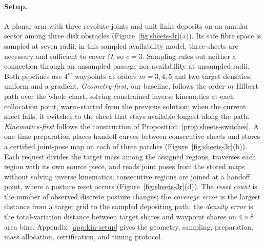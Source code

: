\paragraph{Setup.}
A planar arm with three revolute joints and unit links deposits on an annular sector among three disk obstacles (Figure~\ref{fig:sheets-3r}(a)). Its safe fibre space is sampled at seven radii; in this sampled availability model, three sheets are necessary and sufficient to cover $\Omega$, so $c=3$. Sampling rules out neither a connection through an unsampled passage nor availability at unsampled radii. Both pipelines use $4^m$ waypoints at orders $m=3,4,5$ and two target densities, uniform and a gradient. \emph{Geometry-first}, our baseline, follows the order-$m$ Hilbert path over the whole chart, solving constrained inverse kinematics at each collocation point, warm-started from the previous solution; when the current sheet fails, it switches to the sheet that stays available longest along the path. \emph{Kinematics-first} follows the construction of Proposition~\ref{prop:sheets-switches}. A one-time preparation places handoff curves between consecutive sheets and stores a certified joint-pose map on each of three patches (Figure~\ref{fig:sheets-3r}(b)). Each request divides the target mass among the assigned regions, traverses each region with its own source piece, and reads joint poses from the stored maps without solving inverse kinematics; consecutive regions are joined at a handoff point, where a posture reset occurs (Figure~\ref{fig:sheets-3r}(d)). The \emph{reset count} is the number of observed discrete posture changes; the \emph{coverage error} is the largest distance from a target grid to the sampled depositing path; the \emph{density error} is the total-variation distance between target shares and waypoint shares on $4\times8$ area bins. Appendix~\ref{app:kin-setup} gives the geometry, sampling, preparation, mass allocation, certification, and timing protocol.

